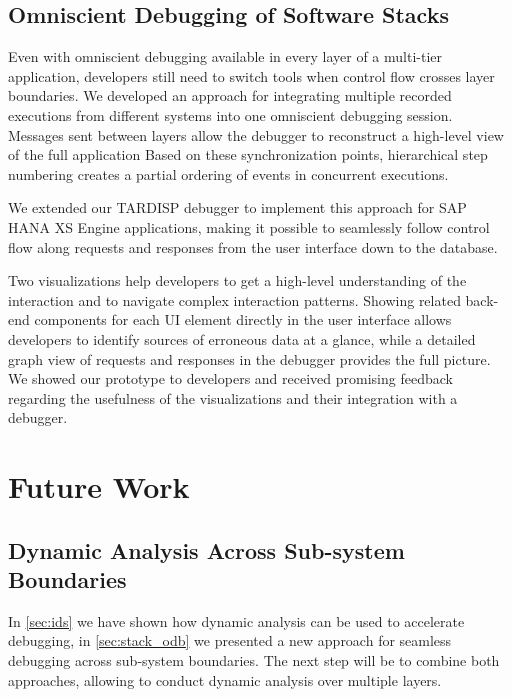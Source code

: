 \subsection{Omniscient Debugging of Software Stacks}

Even with omniscient debugging available in every layer of a multi-tier application, developers still need to switch tools when control flow crosses layer boundaries.
We developed an approach for integrating multiple recorded executions from different systems into one omniscient debugging session.
Messages sent between layers allow the debugger to reconstruct a high-level view of the full application
Based on these synchronization points, hierarchical step numbering creates a partial ordering of events in concurrent executions.

We extended our TARDISP debugger to implement this approach for SAP HANA XS Engine applications,
making it possible to seamlessly follow control flow along requests and responses from the user interface down to the database.

Two visualizations help developers to get a high-level understanding of the interaction and to navigate complex interaction patterns.
Showing related back-end components for each UI element directly in the user interface allows developers to identify sources of erroneous data at a glance,
while a detailed graph view of requests and responses in the debugger provides the full picture.
\tmpStart
We showed our prototype to developers and received promising feedback regarding the usefulness of the visualizations and their integration with a debugger.
\tmpEnd


\section{Future Work}
\label{sec:future_work}

\subsection{Dynamic Analysis Across Sub-system Boundaries}

In \cref{sec:ids} we have shown how dynamic analysis can be used to accelerate debugging, in \cref{sec:stack_odb} we presented a new approach for seamless debugging across sub-system boundaries.
The next step will be to combine both approaches, allowing to conduct dynamic analysis over multiple layers.

